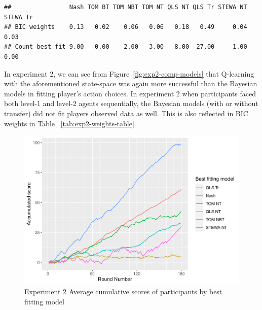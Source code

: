\documentclass[man,floatsintext]{apa6}
\begin{document}
\begin{verbatim}
##                Nash TOM BT TOM NBT TOM NT QLS NT QLS Tr STEWA NT STEWA Tr
## BIC weights    0.13   0.02    0.06   0.06   0.18   0.49     0.04     0.03
## Count best fit 9.00   0.00    2.00   3.00   8.00  27.00     1.00     0.00
\end{verbatim}



\begin{table}

\caption{\label{tab:exp2-weights-table}Experiment 2 - Average BIC weights and number of participants best fit by model}
\centering
{}
\end{table}

In experiment 2, we can see from Figure~\ref{fig:exp2-comp-models} that Q-learning with the aforementioned state-space was again more successful than the Bayesian models in fitting player's action choices. In experiment 2 when participants faced both level-1 and level-2 agents sequentially, the Bayesian models (with or without transfer) did not fit players observed data as well. This is also reflected in BIC weights in Table ~\ref{tab:exp2-weights-table}

\begin{figure}

{\centering \includegraphics{draft_report_v3_files/figure-latex/exp2-cumScores-1} 

}

\caption{Experiment 2 Average cumulative scores of participants by best fitting model}\label{fig:exp2-cumScores}
\end{figure}
\end{document}

